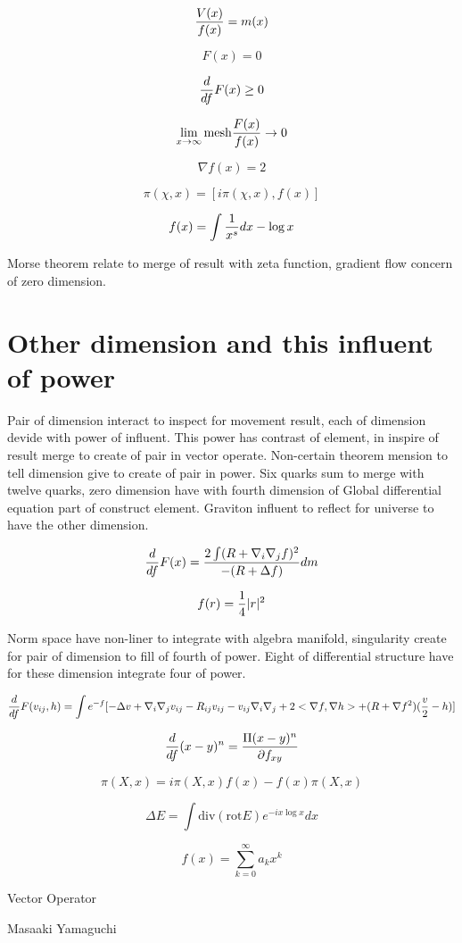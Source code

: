 \documentclass{jsarticle}
\begin{document}
$$ {V(x) \over f(x)} = m(x) $$

$$ F(x) = 0 $$

$$ {d \over df}F(x) \ge 0 $$

$$ \lim_{x \to \infty} \mathrm{mesh} {F(x) \over  f(x)} \to 0 $$

$$ \nabla f(x) = 2 $$

$$ \pi(\chi, x) = [i\pi(\chi,x), f(x)] $$

$$ f(x) = \int {1 \over x^s}dx - \log x $$

  Morse theorem relate to merge of result with zeta function, gradient flow concern of zero dimension.

\section{Other dimension and this influent of power}

  Pair of dimension interact to inspect for movement result, each of dimension devide with power of influent.
This power has contrast of element, in inspire of result merge to create of pair in vector operate.
Non-certain theorem mension to tell dimension give to create of pair in power. Six quarks sum to merge with
twelve quarks, zero dimension have with fourth dimension of Global differential equation part of construct element.
Graviton influent to reflect for universe to have the other dimension.

$$ {d \over df}F(x) = {2 \int (R + \nabla_{i} \nabla_{j} f)^2 \over - (R+ \Delta f)}dm $$

$$ f(r) = {1 \over 4}|r|^2 $$

  Norm space have non-liner to integrate with algebra manifold, singularity create for pair of dimension to fill
of fourth of power. Eight of differential structure have for these dimension integrate four of power.

$$ {d \over df}F(v_{ij}, h) = \int e^{-f} [- \Delta v + \nabla_{i} \nabla_{j} v_{ij} - R_{ij}v_{ij} 
- v_{ij} \nabla_{i} \nabla_{j} + 2 <\nabla f, \nabla h > + (R + \nabla f^2)({v \over 2} -h)] $$

$$ {d \over df}(x - y)^n = {\Pi(x - y)^n \over \partial f_{xy}} $$

$$ \pi(X, x) = i\pi(X, x)f(x) - f(x) \pi(X, x) $$

$$ \Delta E = \int \mathrm{div} (\mathrm{rot}E)e^{-ix \log x} dx $$

$$ f(x) = \sum_{k=0}^\infty a_{k}x^k $$
 
\newpage
\begin{center}
\large	Vector Operator
\end{center}
\begin{center}
	Masaaki Yamaguchi
\end{center}
\end{document}
